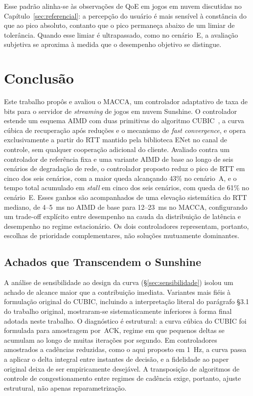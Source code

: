 \documentclass[conference]{IEEEtran}
\begin{document}
Esse padrão alinha-se às observações de QoE em jogos em
nuvem discutidas no Capítulo~\ref{sec:referencial}: a
percepção do usuário é mais sensível à constância do que ao
pico absoluto, contanto que o pico permaneça abaixo de um
limiar de tolerância. Quando esse limiar é ultrapassado, como
no cenário~E, a avaliação subjetiva se aproxima à medida que
o desempenho objetivo se distingue.

\section{Conclusão}\label{sec:conclusao}

Este trabalho propôs e avaliou o MACCA, um
controlador adaptativo de taxa de bits para o servidor de
\emph{streaming} de jogos em nuvem Sunshine. O controlador
estende um esquema AIMD com duas primitivas do algoritmo
CUBIC~\cite{cubic}, a curva cúbica de recuperação após
reduções e o mecanismo de \emph{fast convergence}, e opera
exclusivamente a partir do RTT mantido pela biblioteca ENet
no canal de controle, sem qualquer cooperação adicional do
cliente. Avaliado contra um controlador de referência fixa e
uma variante AIMD de base ao longo de seis cenários de
degradação de rede, o controlador proposto reduz o pico de
RTT em cinco dos seis cenários, com a maior queda alcançando
43\% no cenário~A, e o tempo total acumulado em \emph{stall}
em cinco dos seis cenários, com queda de 61\% no cenário~E.
Esses ganhos são acompanhados de uma elevação sistemática do
RTT mediano, de 4--5~ms no AIMD de base para 12--23~ms no
MACCA, configurando um trade-off explícito entre
desempenho na cauda da distribuição de latência e desempenho
no regime estacionário. Os dois controladores representam,
portanto, escolhas de prioridade complementares, não soluções
mutuamente dominantes.

\subsection{Achados que Transcendem o Sunshine}

A análise de sensibilidade ao design da curva (§\ref{sec:sensibilidade})
isolou um achado de alcance maior que a contribuição
imediata. Variantes mais fiéis à formulação original do CUBIC,
incluindo a interpretação literal do parágrafo §3.1 do
trabalho original, mostraram-se sistematicamente inferiores à
forma final adotada neste trabalho. O diagnóstico é
estrutural: a curva cúbica do CUBIC foi formulada para
amostragem por~ACK, regime em que pequenos deltas se acumulam
ao longo de muitas iterações por segundo. Em controladores
amostrados a cadências reduzidas, como o aqui proposto em
1~Hz, a curva passa a aplicar o delta integral entre instantes
de decisão, e a fidelidade ao paper original deixa de ser
empiricamente desejável. A transposição de algoritmos de
controle de congestionamento entre regimes de cadência exige,
portanto, ajuste estrutural, não apenas reparametrização.
\end{document}
